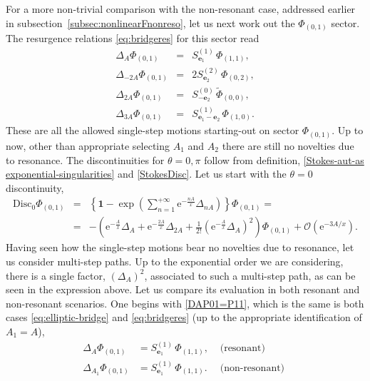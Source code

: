 \documentclass[11pt,a4paper]{article}
\def\1{\mathbf{1}}
\def\disc{{\mathrm{Disc}}}
\begin{document}
For a more non-trivial comparison with the non-resonant case, addressed earlier in subsection~\ref{subsec:nonlinearFnonreso}, let us next work out the $\Phi_{(0,1)}$ sector. The resurgence relations \eqref{eq:bridgeres} for this sector read
%
\begin{eqnarray}
\label{DAP01=P11}
\Delta_A \Phi_{(0,1)} &=& S^{(1)}_{\boldsymbol{e}_1}\, \Phi_{(1,1)}, \\
\label{ell-delta-pi-sec01}
\Delta_{-2A} \Phi_{(0,1)} &=& 2 S^{(2)}_{\boldsymbol{e}_2}\, \Phi_{(0,2)}, \\
\label{D2AP01=tP00}
\Delta_{2A} \Phi_{(0,1)} &=& S^{(0)}_{-\boldsymbol{e}_2}\, \widetilde{\Phi}_{(0,0)}, \\
\Delta_{3A} \Phi_{(0,1)} &=& S^{(1)}_{\boldsymbol{e}_1-\boldsymbol{e}_2}\, \Phi_{(1,0)}.
\end{eqnarray}
%
\noindent
These are all the allowed single-step motions starting-out on sector $\Phi_{(0,1)}$. Up to now, other than appropriate selecting $A_1$ and $A_2$ there are still no novelties due to resonance. The discontinuities for $\theta=0,\pi$ follow from definition, \eqref{Stokes-aut-as exponential-singularities} and \eqref{StokesDisc}. Let us start with the $\theta=0$ discontinuity,
%
\begin{eqnarray}
\disc_0 \Phi_{(0,1)} &=& \left\{ \1 - \exp \left( \sum_{n=1}^{+\infty} \mathrm{e}^{-\frac{nA}{x}} \Delta_{nA} \right) \right\} \Phi_{(0,1)} = \\
&=& - \left( \mathrm{e}^{-\frac{A}{x}} \Delta_{A} + \mathrm{e}^{-\frac{2A}{x}} \Delta_{2A} + \frac{1}{2!} \left( \mathrm{e}^{-\frac{A}{x}} \Delta_{A}\right)^2 \right) \Phi_{(0,1)} + \mathcal{O}(\mathrm{e}^{-3A/x}). \nonumber
\end{eqnarray}
%
\noindent
Having seen how the single-step motions bear no novelties due to resonance, let us consider multi-step paths. Up to the exponential order we are considering, there is a single factor, $\left( \Delta_A \right)^2$, associated to such a multi-step path, as can be seen in the expression above. Let us compare its evaluation in both resonant and non-resonant scenarios. One begins with \eqref{DAP01=P11}, which is the same is both cases \eqref{eq:elliptic-bridge} and \eqref{eq:bridgeres} (up to the appropriate identification of $A_1 = A$),
%
\begin{align}
\label{DA01reso}
\Delta_A \Phi_{(0,1)} &= S^{(1)}_{\boldsymbol{e}_1}\, \Phi_{(1,1)}, &\text{ (resonant) } \\
\Delta_{A_1} \Phi_{(0,1)} &= S^{(1)}_{\boldsymbol{e}_1}\, \Phi_{(1,1)}. &\text{ (non-resonant) }
\end{align}
\end{document}
